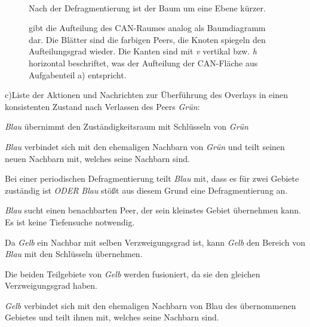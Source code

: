 \documentclass[10pt,a4paper]{article}
\begin{document}
\begin{figure}[h!]
\begin{multicols}{3}
\\
\begin{flushleft}
Nach der Defragmentierung ist der Baum um eine Ebene kürzer.
\end{flushleft}
\end{multicols}
\caption{gibt die Aufteilung des CAN-Raumes analog als Baumdiagramm dar. Die Blätter sind die farbigen Peers, die Knoten spiegeln den Aufteilungsgrad wieder. Die Kanten sind mit \textit{v} vertikal bzw. \textit{h} horizontal beschriftet, was der Aufteilung der CAN-Fläche aus Aufgabenteil a) entspricht.} \label{fig:2}
\end{figure}

\noindent c)\quad Liste der Aktionen und Nachrichten zur Überführung des Overlays in einen konsistenten Zustand nach Verlassen des Peers \textit{Grün}:
\begin{compactitem}[–]
\item \textit{Blau} übernimmt den Zuständigkeitsraum mit Schlüsseln von \textit{Grün}
\item \textit{Blau} verbindet sich mit den ehemaligen Nachbarn von \textit{Grün} und teilt seinen neuen Nachbarn mit, welches seine Nachbarn sind.
\item Bei einer periodischen Defragmentierung teilt \textit{Blau} mit, dass es für zwei Gebiete zuständig ist \textit{ODER} \textit{Blau} stößt aus diesem Grund eine Defragmentierung an.
\item \textit{Blau} sucht einen benachbarten Peer, der sein kleinstes Gebiet übernehmen kann. Es ist keine Tiefensuche notwendig.
\item Da \textit{Gelb} ein Nachbar mit selben Verzweigungsgrad ist, kann \textit{Gelb} den Bereich von \textit{Blau} mit den Schlüsseln übernehmen.
\item Die beiden Teilgebiete von \textit{Gelb} werden fusioniert, da sie den gleichen Verzweigungsgrad haben.
\item \textit{Gelb} verbindet sich mit den ehemaligen Nachbarn von Blau des übernommenen Gebietes und teilt ihnen mit, welches seine Nachbarn sind.
\end{compactitem}
\end{document}
